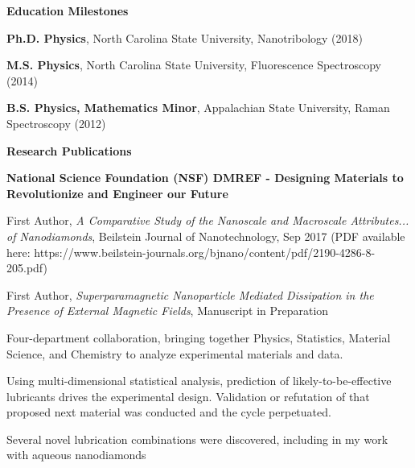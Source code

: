 \documentclass[letterpaper,final]{memoir}
\newcommand{\Sep}{\vspace{1.0em}}
\newcommand{\SmallSep}{\vspace{0.4em}}
\newcommand{\CVSection}[1]
	{\LARGE\textbf{#1}\par
	\SmallSep\normalsize}
\newcommand{\CVItem}[1]
	{\textbf{\color{Blue} #1}}
\begin{document}

\notoserif \CVSection{Education Milestones}
\normalfont
\Sep
\begin{compactitem}[\color{Blue}$\circ$]

\item \textbf{Ph.D. Physics}, North Carolina State University, Nanotribology (2018)
\SmallSep
\item \textbf{M.S. Physics}, North Carolina State University, Fluorescence Spectroscopy (2014)
\SmallSep
\item \textbf{B.S. Physics, Mathematics Minor}, Appalachian State University, Raman Spectroscopy (2012)

\end{compactitem}
\Sep



\notoserif \CVSection{Research Publications}
\normalfont

\SmallSep
\CVItem{National Science Foundation (NSF) DMREF - Designing Materials to Revolutionize and Engineer our Future} 
\SmallSep

\begin{compactitem}[\color{Blue}$\circ$]
	 
    \item First Author, \textit{A Comparative Study of the Nanoscale and Macroscale Attributes... of Nanodiamonds}, Beilstein Journal of Nanotechnology, Sep 2017 (PDF available here: https://www.beilstein-journals.org/bjnano/content/pdf/2190-4286-8-205.pdf)
    \SmallSep

    \item First Author, \textit{Superparamagnetic Nanoparticle Mediated Dissipation in the Presence of External Magnetic Fields}, Manuscript in Preparation
    \SmallSep

    \item Four-department collaboration, bringing together Physics, Statistics, Material Science, and Chemistry to analyze experimental
            materials and data. 
    \SmallSep

    \item Using multi-dimensional statistical analysis, prediction of likely-to-be-effective lubricants drives the experimental design.
            Validation or refutation of that proposed next material was conducted and the cycle perpetuated. 
    \SmallSep
            
    \item Several novel lubrication combinations were discovered, including in my
            work with aqueous nanodiamonds
	
\end{compactitem}
\end{document}
